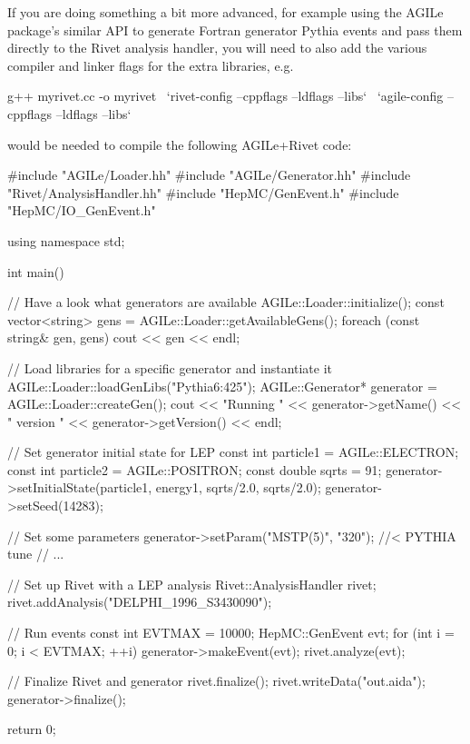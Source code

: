 \documentclass{JHEP3}
\begin{document}
If you are doing something a bit more advanced, for example using the AGILe
package's similar API to generate Fortran generator Pythia events and pass them
directly to the Rivet analysis handler, you will need to also add the various
compiler and linker flags for the extra libraries, e.g.
%
\begin{snippet}
g++ myrivet.cc -o myrivet \
  `rivet-config --cppflags --ldflags --libs` \
  `agile-config --cppflags --ldflags --libs`
\end{snippet}
%
would be needed to compile the following AGILe+Rivet code:
%
\goodbreak
\begin{snippet}
#include "AGILe/Loader.hh"
#include "AGILe/Generator.hh"
#include "Rivet/AnalysisHandler.hh"
#include "HepMC/GenEvent.h"
#include "HepMC/IO_GenEvent.h"

using namespace std;

int main() {
  // Have a look what generators are available
  AGILe::Loader::initialize();
  const vector<string> gens = AGILe::Loader::getAvailableGens();
  foreach (const string& gen, gens) {
    cout << gen << endl;
  }

  // Load libraries for a specific generator and instantiate it
  AGILe::Loader::loadGenLibs("Pythia6:425");
  AGILe::Generator* generator = AGILe::Loader::createGen();
  cout << "Running " << generator->getName()
       << " version " << generator->getVersion() << endl;

  // Set generator initial state for LEP
  const int particle1 = AGILe::ELECTRON;
  const int particle2 = AGILe::POSITRON;
  const double sqrts = 91;
  generator->setInitialState(particle1, energy1, sqrts/2.0, sqrts/2.0);
  generator->setSeed(14283);

  // Set some parameters
  generator->setParam("MSTP(5)", "320"); //< PYTHIA tune
  // ...

  // Set up Rivet with a LEP analysis
  Rivet::AnalysisHandler rivet;
  rivet.addAnalysis("DELPHI_1996_S3430090");

  // Run events
  const int EVTMAX = 10000;
  HepMC::GenEvent evt;
  for (int i = 0; i < EVTMAX; ++i) {
    generator->makeEvent(evt);
    rivet.analyze(evt);
  }

  // Finalize Rivet and generator
  rivet.finalize();
  rivet.writeData("out.aida");
  generator->finalize();

  return 0;
}
\end{snippet}
\end{document}
